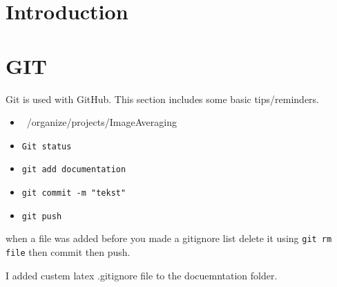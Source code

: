 \documentclass[10pt,a4paper]{report}
\author{Jeroen Keizer}
\begin{document}
\section{Introduction}
\section{GIT}
Git is used with GitHub.
This section includes some basic tips/reminders.
\begin{itemize}
\item ~/organize/projects/ImageAveraging
\item \verb|Git status|
\item \verb|git add documentation|
\item \verb|git commit -m "tekst"|
\item \verb|git push|
\end{itemize}
when a file was added before you made a gitignore list delete it using \verb|git rm file| then commit then push.

I added custem latex .gitignore file to the docuemntation folder.
\end{document}
